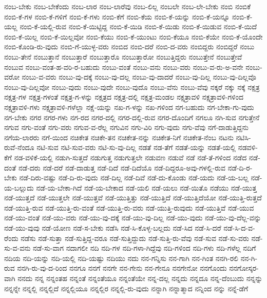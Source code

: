 {ನಂಬ-ಬೇಕು
ನಂಬ-ಬೇಕೆಂದು
ನಂಬ-ಲಾರ
ನಂಬ-ಲಾರೆವು
ನಂಬ-ಲಿಲ್ಲ
ನಂಬಲೇ
ನಂಬ-ಲೇ-ಬೇಕು
ನಂಬಿ
ನಂಬಿಕೆ
ನಂಬಿ-ಕೆ-ಗಳ
ನಂಬಿ-ಕೆ-ಗಳಿಗೆ
ನಂಬಿ-ಕೆ-ಗಳು
ನಂಬಿ-ಕೆಗೆ
ನಂಬಿ-ಕೆಯ
ನಂಬಿ-ಕೆ-ಯನ್ನು
ನಂಬಿ-ಕೆ-ಯನ್ನೂ
ನಂಬಿ-ಕೆ-ಯಲ್ಲ
ನಂಬಿ-ಕೆ-ಯಲ್ಲಿ-ರುವ
ನಂಬಿ-ಕೆ-ಯಿಟ್ಟಿದ್ದ
ನಂಬಿ-ಕೆ-ಯಿಡಿ
ನಂಬಿ-ಕೆ-ಯಿಡು
ನಂಬಿ-ಕೆ-ಯಿಡುವ
ನಂಬಿ-ಕೆ-ಯಿದೆ
ನಂಬಿ-ಕೆ-ಯಿಲ್ಲ
ನಂಬಿ-ಕೆ-ಯಿಲ್ಲವೋ
ನಂಬಿ-ಕೆಯು
ನಂಬಿ-ಕೆ-ಯುಂಟು
ನಂಬಿ-ಕೆಯೂ
ನಂಬಿ-ಕೆಯೇ
ನಂಬಿ-ಕೆ-ಯೊಂದೇ
ನಂಬಿ-ಕೊಂಡಿ-ರು-ವುದು
ನಂಬಿ-ಗೆ-ಯುಳ್ಳ-ವರು
ನಂಬಿದ
ನಂಬಿ-ದರೆ
ನಂಬಿ-ದ-ವರು
ನಂಬಿದ್ದರು
ನಂಬಿದ್ದರೆ
ನಂಬು
ನಂಬು-ತೇನೆ
ನಂಬುತ್ತಾನೆ
ನಂಬುತ್ತಾರೆ
ನಂಬುತ್ತಾರೊ
ನಂಬುತ್ತಾರೋ
ನಂಬುತ್ತಿದ್ದರು
ನಂಬುತ್ತೇನೆ
ನಂಬುತ್ತೇವೆ
ನಂಬುವ
ನಂಬು-ವಂತ-ಹ-ವರಿ-ರ-ಬಹುದು
ನಂಬು-ವಂತೆ
ನಂಬು-ವನು
ನಂಬು-ವರು
ನಂಬು-ವ-ರು-ಅ-ವನೇ
ನಂಬು-ವರೋ
ನಂಬು-ವ-ವರು
ನಂಬು-ವು-ದಕ್ಕೆ
ನಂಬು-ವು-ದಲ್ಲ
ನಂಬು-ವು-ದಾದರೆ
ನಂಬು-ವು-ದಿಲ್ಲ
ನಂಬು-ವು-ದಿಲ್ಲವೊ
ನಂಬು-ವು-ದಿಲ್ಲವೋ
ನಂಬು-ವುದು
ನಂಬು-ವುದೇ
ನಂಬು-ವುದೊ
ನಂಬು-ವೆನು
ನಂಬು-ವೆವು
ನಕ್ಕರೆ
ನಕ್ಕು
ನಕ್ಕೆ
ನಕ್ಷತ್ರ
ನಕ್ಷತ್ರ-ಗಳ
ನಕ್ಷತ್ರ-ಗಳಂತೆ
ನಕ್ಷತ್ರ-ಗ-ಳನ್ನು
ನಕ್ಷತ್ರದ
ನಕ್ಷತ್ರ-ದಲ್ಲಿ
ನಕ್ಷತ್ರ-ಮಂಡಲ
ನಕ್ಷತ್ರಾವಳಿ
ನಕ್ಷತ್ರಾವಳಿ-ಗಳಿಂದ
ನಕ್ಷತ್ರಾವಳಿ-ಗಳು
ನಕ್ಷತ್ರಾವಳಿ-ಗಳೆಲ್ಲಾ
ನಕ್ಷೆ-ಯನ್ನು
ನಖ-ಗ-ಳನ್ನು
ನಖ-ಗಳಿಂದ
ನಗ-ಬಹುದು
ನಗ-ಬೇಕಾ-ಗು-ವುದು
ನಗ-ಬೇಕು
ನಗರ
ನಗರ-ಗಳು
ನಗ-ರದ
ನಗರ-ದಲ್ಲಿ
ನಗರ-ದಲ್ಲಿ-ರುವ
ನಗರ-ದೊಂದಿಗೆ
ನಗಲೂ
ನಗಿ-ಸುವ
ನಗುತ್ತೇನೆ
ನಗುವ
ನಗು-ವಂತೆ
ನಗು-ವರು
ನಗುವ-ವ-ರೆಲ್ಲ
ನಗುವಿನ
ನಗು-ವಿರಿ
ನಗು-ವುದು
ನಗು-ವೆವು
ನಗೆ-ದಾಡುತ್ತಿದ್ದನು
ನಗೆಯ-ಲಾರರು
ನಗೆ-ಯಿಂದ
ನಚಿಕೇತ
ನಚಿಕೇ-ತನ
ನಚಿಕೇತ-ನನ್ನು
ನಚಿಕೇತ-ನಿಗೆ
ನಚಿಕೇತ-ನೆಂಬ
ನಟನು
ನಟಿಸಿ-ರುವೆ-ನೆಂದೂ
ನಟಿ-ಸುವ
ನಟಿ-ಸುವ-ವರು
ನಟಿ-ಸು-ವು-ದಿಲ್ಲ
ನಡತೆ
ನಡ-ತೆಗೆ
ನಡತೆ-ಯನ್ನು
ನಡತೆ-ಯಲ್ಲಿ
ನಡವಳಿ-ಕೆಗೆ
ನಡ-ವಳಿಕೆ-ಯಲ್ಲಿ
ನಡುಗಿ-ಸುತ್ತದೆ
ನಡುಗುತ್ತ
ನಡುಗುತ್ತಲೇ
ನಡುವಣ
ನಡುವೆ
ನಡೆ
ನಡೆ-ತೆ-ಗಳಿಂದ
ನಡೆದ
ನಡೆ-ದಂತೆ
ನಡೆ-ದರು
ನಡೆ-ದರೆ
ನಡೆ-ದಾಡುತ್ತ
ನಡೆ-ದಿದೆ
ನಡೆ-ದಿದೆಯೊ
ನಡೆ-ದಿದ್ದರೂ-ಅವು-ಗಳಲ್ಲಿ-ರುವ
ನಡೆ-ದಿ-ರ-ಬೇಕು
ನಡೆ-ದಿರು-ವಷ್ಟು
ನಡೆ-ದಿ-ರು-ವುದು
ನಡೆ-ದಿಲ್ಲ
ನಡೆ-ದಿವೆ
ನಡೆ-ದು-ಕೊಂಡು
ನಡೆ-ಯದು
ನಡೆ-ಯ-ಬಲ್ಲ
ನಡೆ-ಯ-ಬಲ್ಲುದು
ನಡೆ-ಯ-ಬೇಕಾ-ಗಿದೆ
ನಡೆ-ಯ-ಬೇಕಾದ
ನಡೆ-ಯಲಿ
ನಡೆ-ಯಲು
ನಡೆ-ಯಿತೊ
ನಡೆಯು
ನಡೆ-ಯುತ್ತ
ನಡೆ-ಯುತ್ತದೆ
ನಡೆ-ಯುತ್ತಲೇ
ನಡೆ-ಯುತ್ತವೆ
ನಡೆ-ಯುತ್ತಿತ್ತು
ನಡೆ-ಯುತ್ತಿದೆ
ನಡೆ-ಯುತ್ತಿದೆಯೋ
ನಡೆ-ಯುತ್ತಿ-ರುತ್ತದೆ
ನಡೆ-ಯುತ್ತಿ-ರುವ
ನಡೆ-ಯುತ್ತಿ-ರು-ವಂತೆ
ನಡೆ-ಯುತ್ತಿ-ರು-ವರು
ನಡೆ-ಯುತ್ತಿ-ರುವುದು
ನಡೆ-ಯುತ್ತಿವೆ
ನಡೆ-ಯುವ
ನಡೆ-ಯು-ವಂತೆ
ನಡೆ-ಯು-ವರು
ನಡೆ-ಯು-ವು-ದಕ್ಕೆ
ನಡೆ-ಯು-ವು-ದಿಲ್ಲ
ನಡೆ-ಯು-ವುದು
ನಡೆ-ಯು-ವು-ದೆಲ್ಲ-ವನ್ನು
ನಡೆ-ಯು-ವುವು
ನಡೆ-ಯೋಣ
ನಡೆ-ಸ-ಬೇಕು
ನಡೆಸಿ
ನಡೆ-ಸಿ-ಕೊಳ್ಳ-ಬಲ್ಲದು
ನಡೆ-ಸಿದ
ನಡೆ-ಸಿ-ದರೆ
ನಡೆ-ಸಿ-ದ-ವ-ರೆಂದು
ನಡೆಸು
ನಡೆ-ಸುತ್ತಾ
ನಡೆ-ಸುತ್ತಿದ್ದ-ವರೂ
ನಡೆ-ಸುತ್ತಿದ್ದುದು
ನಡೆ-ಸುತ್ತಿ-ರು-ವೆವು
ನಡೆ-ಸುವ
ನಡೆ-ಸು-ವರು
ನಡೆ-ಸು-ವ-ವನು
ನಡೆ-ಸು-ವಾಗ
ನದಾಗಲೀ
ನದಿ
ನದಿ-ಗಳ
ನದಿ-ಗಳಾ-ಗಿದ್ದೆವು
ನದಿ-ಗಳಿಂದ
ನದಿ-ಗಳು
ನದಿ-ಗಳೆಲ್ಲ
ನದಿಗೆ
ನದಿಯ
ನದಿ-ಯನ್ನು
ನದಿ-ಯಲ್ಲಿ
ನದಿ-ಯಷ್ಟು
ನದಿಯು
ನದು
ನನ-ಗನ್ನಿಸು
ನನ-ಗಾಗಿ
ನನ-ಗಿಂತ
ನನಗಿ-ರಲಿ
ನನ-ಗಿ-ರುವ
ನನಗಿ-ರು-ವು-ದ-ರಿಂದ
ನನಗೂ
ನನಗೆ
ನನಗೇ
ನನ-ಗೇನು
ನನ-ಗೇನೂ
ನನಗೇನೋ
ನನಗೊಂದು
ನನಗೋಸ್ಕರ-ವಾಗಿ
ನನದು
ನನ್ನ
ನನ್ನಂತಹ
ನನ್ನಂತೆ
ನನ್ನಂತೆಯೂ
ನನ್ನಂತೆಯೇ
ನನ್ನ-ದಲ್ಲ
ನನ್ನದು
ನನ್ನದೂ
ನನ್ನ-ದೆಂಬುದು
ನನ್ನನ್ನು
ನನ್ನನ್ನೇ
ನನ್ನಲ್ಲಿ
ನನ್ನಲ್ಲಿದೆ
ನನ್ನಲ್ಲಿಯೂ
ನನ್ನಲ್ಲಿರ
ನನ್ನಲ್ಲಿ-ರು-ವುದು
ನನ್ನಾಗಿ
ನನ್ನಾತ್ಮಾದ
ನನ್ನಿಂದ
ನನ್ನು
ನನ್ನೆ-ಡೆಗೆ
}
